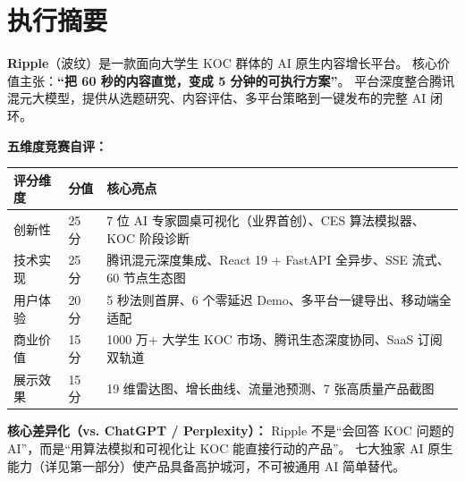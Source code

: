 \documentclass[12pt,a4paper]{ctexart}
\begin{document}
\newpage
\tableofcontents
\newpage


\section*{执行摘要}

\begin{tcolorbox}[colback=primary!6,colframe=primary,arc=5pt,
  left=10pt,right=10pt,top=8pt,bottom=8pt]
\textbf{Ripple}（波纹）是一款面向大学生 KOC 群体的 AI 原生内容增长平台。
核心价值主张：\textbf{``把 60 秒的内容直觉，变成 5 分钟的可执行方案''}。
平台深度整合腾讯混元大模型，提供从选题研究、内容评估、多平台策略到一键发布的完整 AI 闭环。
\end{tcolorbox}

\vspace{0.3cm}
\textbf{五维度竞赛自评：}

\begin{center}
\begin{tabular}{p{3cm} p{1.2cm} p{10cm}}
\toprule
\textbf{评分维度} & \textbf{分值} & \textbf{核心亮点} \\
\midrule
创新性 & 25 分 & 7 位 AI 专家圆桌可视化（业界首创）、CES 算法模拟器、KOC 阶段诊断 \\[3pt]
技术实现 & 25 分 & 腾讯混元深度集成、React 19 + FastAPI 全异步、SSE 流式、60 节点生态图 \\[3pt]
用户体验 & 20 分 & 5 秒法则首屏、6 个零延迟 Demo、多平台一键导出、移动端全适配 \\[3pt]
商业价值 & 15 分 & 1000 万+ 大学生 KOC 市场、腾讯生态深度协同、SaaS 订阅双轨道 \\[3pt]
展示效果 & 15 分 & 19 维雷达图、增长曲线、流量池预测、7 张高质量产品截图 \\
\bottomrule
\end{tabular}
\end{center}

\vspace{0.3cm}
\textbf{核心差异化（vs. ChatGPT / Perplexity）：}
Ripple 不是``会回答 KOC 问题的 AI''，而是``用算法模拟和可视化让 KOC 能直接行动的产品''。
七大独家 AI 原生能力（详见第一部分）使产品具备高护城河，不可被通用 AI 简单替代。


\newpage
\begin{center}
\end{center}
\end{document}
